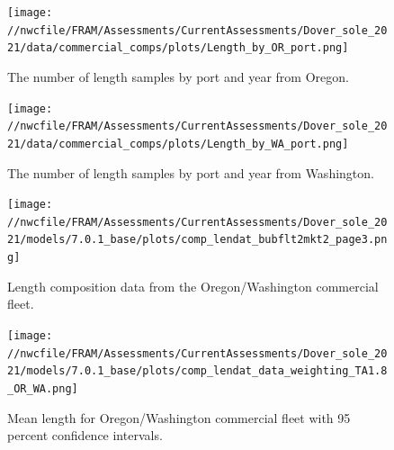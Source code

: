 \documentclass[11pt,
  english,
  a4paper,
]{article}
\begin{document}

\begin{figure}
\centering
\texttt{[image: //nwcfile/FRAM/Assessments/CurrentAssessments/Dover\_sole\_2021/data/commercial\_comps/plots/Length\_by\_OR\_port.png]}
\caption{The number of length samples by port and year from Oregon.\label{fig:or-len-port}}
\end{figure}

\tagmcend\tagstructend

\clearpage


\begin{figure}
\centering
\texttt{[image: //nwcfile/FRAM/Assessments/CurrentAssessments/Dover\_sole\_2021/data/commercial\_comps/plots/Length\_by\_WA\_port.png]}
\caption{The number of length samples by port and year from Washington.\label{fig:wa-len-port}}
\end{figure}

\tagmcend\tagstructend


\begin{figure}
\centering
\texttt{[image: //nwcfile/FRAM/Assessments/CurrentAssessments/Dover\_sole\_2021/models/7.0.1\_base/plots/comp\_lendat\_bubflt2mkt2\_page3.png]}
\caption{Length composition data from the Oregon/Washington commercial fleet.\label{fig:orwa-len-data}}
\end{figure}

\tagmcend\tagstructend


\begin{figure}
\centering
\texttt{[image: //nwcfile/FRAM/Assessments/CurrentAssessments/Dover\_sole\_2021/models/7.0.1\_base/plots/comp\_lendat\_data\_weighting\_TA1.8\_OR\_WA.png]}
\caption{Mean length for Oregon/Washington commercial fleet with 95 percent confidence intervals.\label{fig:mean-orwa-len-data}}
\end{figure}

\tagmcend\tagstructend
\end{document}
